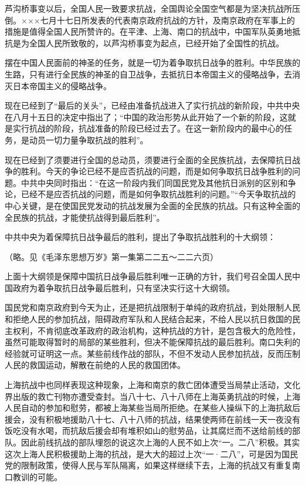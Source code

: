 芦沟桥事变以后，全国人民一致要求抗战，全国舆论全国空气都是为坚决抗战所压倒。×××七月十七日所发表的代表南京政府抗战的方针，及南京政府在军事上的措施是值得全国人民所赞许的。在平津、上海、南口的抗战中，中国军队英勇地抵抗是为全国人民所致敬的，以芦沟桥事变为起点，已经开始了全国性的抗战。

摆在中国人民面前的神圣的任务，就是一切为着争取抗日战争的胜利。中华民族的生路，只有进行全民族的神圣的自卫战争，去抵抗日本帝国主义的侵略战争，去消灭日本帝国主义的侵略战争。

现在已经到了“最后的关头”，已经由准备抗战进入了实行抗战的新阶段，中共中央在八月十五日的决定中指出了；“中国的政治形势从此开始了一个新的阶段，这就是实行抗战的阶段，抗战准备的阶段已经过去了。在这一新阶段内的最中心的任务，是动员一切力量争取抗战的胜利”。

现在已经到了须要进行全国的总动员，须要进行全面的全民族抗战，去保障抗日战争的胜利。今天的争论已经不是应否抗战的问题，而是如何争取抗日战争胜利的问题。中共中央同时指出：“在这一阶段内我们同国民党及其他抗日派别的区别和争论，已经不是应否抗战的问题，而是如何争取抗战胜利的问题。”“今天争取抗战的中心关键，是在使国民党发动的抗战发展为全面的全民族的抗战。只有这种全面的全民族的抗战，才能使抗战得到最后胜利”。

中共中央为着保障抗日战争最后的胜利，提出了争取抗战胜利的十大纲领：

（略。见《毛泽东思想万岁》第一集第二二五～二二六页）

上面十大纲领是保障中国抗日战争最后胜利唯一正确的方针，我们号召全国人民中国政府为着争取抗日战争最后胜利，只有坚决实行这十大纲领。

国民党和南京政府到今天为止，还是把抗战限制于单纯的政府抗战，到处限制人民和拒绝人民的参加抗战，阻碍政府军队和人民结合起来，不给人民以抗日救国的民主权利，不肯彻底改革政府的政治机构，这种抗战的方针，是包含极大的危险性，虽然可能取得暂时的局部的某些胜利，但决不能保障抗战的最后胜利。南口失利的经验就可证明这一点。某些前线作战的部队，不但不发动人民参加抗战，反而压制人民的救国运动，解散在前绝的人民的救国团体。

上海抗战中也同样表现这种现象，上海和南京的救亡团体遭受当局禁止活动，文化界出版的救亡刊物亦遭受查封。当八十七、八十八师在上海英勇抗战的时候，上海人民自动的参加和慰劳，都被上海某些当局所拒绝。在某些人操纵下的上海抗敌后援会，没有积极地援助八十七、八十八师的抗战，结果使两师在前线一天一夜没有饭吃没有水喝，而抗敌后援会却有堆积如山的慰劳品，让其腐烂而不送给前线的部队。因此前线抗战的部队埋怨的说这次上海的人民不如上次“一。二八”积极。其实这次上海人民积极援助上海的抗战，是大大的超过上次“一·二八”，可是因为国民党的限制政策，使得人民与军队隔离，如果这样继续下去，上海的抗战又有重复南口教训的可能。

